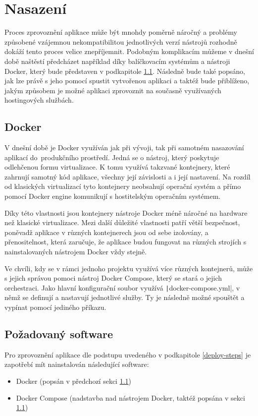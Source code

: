 \chapter{Nasazení}
Proces zprovoznění aplikace může být mnohdy poměrně náročný a problémy způsobené vzájemnou nekompatibilitou jednotlivých verzí nástrojů rozhodně dokáží tento proces velice znepříjemnit. Podobným komplikacím můžeme v dnešní době naštěstí předcházet například díky balíčkovacím systémům a nástroji Docker, který bude představen v podkapitole \ref{docker}. Následně bude také popsáno, jak lze právě s jeho pomocí spustit vytvořenou aplikaci a taktéž bude přiblíženo, jakým způsobem je možné aplikaci zprovoznit na současně využívaných hostingových službách.

\section{Docker}\label{docker}
V dnešní době je Docker využíván jak při vývoji, tak při samotném nasazování aplikací do~produkčního prostředí. Jedná se o nástroj, který poskytuje odlehčenou formu virtualizace. K tomu využívá takzvané kontejnery, které zahrnují samotný kód aplikace, všechny její závislosti a i její nastavení. Na rozdíl od klasických virtualizací tyto kontejnery neobsahují operační systém a přímo pomocí Docker engine komunikují s hostitelským operačním systémem. \cite{docker}

Díky této vlastnosti jsou kontejnery nástroje Docker méně náročné na hardware než klasické virtualizace. Mezi další důležité vlastnosti patří větší bezpečnost, poněvadž aplikace v různých kontejnerech jsou od sebe izolovány, a přenositelnost, která zaručuje, že aplikace budou fungovat na různých strojích s nainstalovaných nástrojem Docker vždy stejně. \cite{docker}

Ve chvíli, kdy se v rámci jednoho projektu využívá více různých kontejnerů, může s jejich správou pomoci nástroj Docker Compose, který se stará o jejich orchestraci. Jako hlavní konfigurační soubor využívá \texttt|docker-compose.yml|, v němž se definují a nastavují jednotlivé služby. Ty je následně možné spouštět a vypínat pomocí jediného příkazu.

\section{Požadovaný software}
Pro zprovoznění aplikace dle podstupu uvedeného v podkapitole \ref{deploy-steps} je zapotřebí mít nainstalován následující software:
\begin{itemize}
	\item Docker (popsán v předchozí sekci \ref{docker})
	\item Docker Compose (nadstavba nad nástrojem Docker, taktéž popsána v sekci \ref{docker})
\end{itemize}

